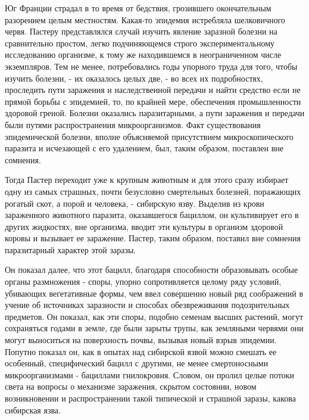 Юг Франции  страдал в  то время  от бедствия,  грозившего  окончательным
разорением целым местностям.  Какая-то эпидемия истребляла  шелковичного
червя. Пастеру представлялся случай изучить явление заразной болезни  на
сравнительно  простом,  легко  подчиняющемся  строго  экспериментальному
исследованию организме, к  тому же находившемся  в неограниченном  числе
экземпляров. Тем не менее, потребовались  годы упорного труда для  того,
чтобы  изучить  болезни,  -  их  оказалось  целых  две,  -  во  всех  их
подробностях, проследить  пути  заражения и  наследственной  передачи  и
найти средство если не прямой борьбы  с эпидемией, то, по крайней  мере,
обеспечения   промышленности   здоровой   греной.   Болезни    оказались
паразитарными, а пути заражения  и передачи были путями  распространения
микроорганизмов.  Факт  существования   эпидемической  болезни,   вполне
объясняемой присутствием микроскопического паразита  и исчезающей с  его
удалением, был, таким образом, поставлен вне сомнения.

Тогда Пастер переходит уже к крупным животным и для этого сразу избирает
одну  из  самых   страшных,  почти   безусловно  смертельных   болезней,
поражающих рогатый скот, а порой  и человека, - сибирскую язву.  Выделив
из крови  зараженного  животного  паразита,  оказавшегося  бациллом,  он
культивирует его в других жидкостях, вне организма, вводит эти  культуры
в организм  здоровой  коровы  и вызывает  ее  заражение.  Пастер,  таким
образом, поставил вне сомнения паразитарный характер этой заразы.

Он показал далее,  что этот бацилл,  благодаря способности  образовывать
особые органы  размножения -  споры, упорно  сопротивляется целому  ряду
условий, убивающих  вегетативные формы,  чем ввел  совершенно новый  ряд
соображений в учение об источниках заразности и способах  обезвреживания
подозрительных предметов.  Он показал,  как эти  споры, подобно  семенам
высших растений,  могут  сохраняться годами  в  земле, где  были  зарыты
трупы, как земляными червями они могут выноситься на поверхность  почвы,
вызывая новый  взрыв эпидемии.  Попутно  показал он,  как в  опытах  над
сибирской язвой  можно  смешать  ее особенный,  специфический  бацилл  с
другими,   не   менее   смертоносными   микроорганизмами   -   бациллами
гнилокровия. Словом, он пролил целые потоки света на вопросы о механизме
заражения, скрытом  состоянии,  новом  возникновении  и  распространении
такой типической и страшной заразы, какова сибирская язва.

